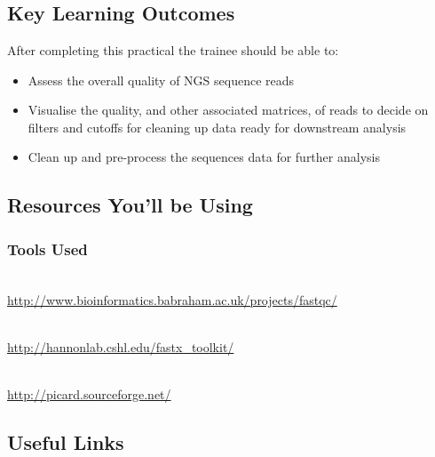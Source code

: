 
\chapter{\moduleTitle}
\newpage

\section{Key Learning Outcomes}

After completing this practical the trainee should be able to:
\begin{itemize}
  \item Assess the overall quality of NGS sequence reads
  \item Visualise the quality, and other associated matrices, of reads to decide
        on filters and cutoffs for cleaning up data ready for downstream analysis
  \item Clean up and pre-process the sequences data for further analysis
\end{itemize}

\section{Resources You'll be Using}
 
\subsection{Tools Used}
\begin{description}[style=multiline,labelindent=0cm,align=left,leftmargin=0.5cm]
  \item[FastQC]\hfill\\
  	\url{http://www.bioinformatics.babraham.ac.uk/projects/fastqc/}
  \item[FASTX-Toolkit]\hfill\\
  	\url{http://hannonlab.cshl.edu/fastx_toolkit/}
  \item[Picard]\hfill\\
  	\url{http://picard.sourceforge.net/}
\end{description}

\section{Useful Links}
 
